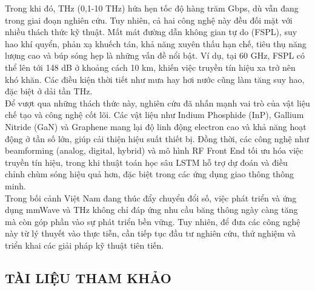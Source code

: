 \documentclass[a4paper,13pt]{article} %
\begin{document}
Trong khi đó, THz (0,1-10 THz) hứa hẹn tốc độ hàng trăm Gbps, dù vẫn đang trong giai đoạn nghiên cứu.
Tuy nhiên, cả hai công nghệ này đều đối mặt với nhiều thách thức kỹ thuật. Mất mát đường dẫn không gian tự do (FSPL), suy hao khí quyển, phản xạ khuếch tán, khả năng xuyên thấu hạn chế, tiêu thụ năng lượng cao và búp sóng hẹp là những vấn đề nổi bật. Ví dụ, tại 60 GHz, FSPL có thể lên tới 148 dB ở khoảng cách 10 km, khiến việc truyền tín hiệu xa trở nên khó khăn. Các điều kiện thời tiết như mưa hay hơi nước cũng làm tăng suy hao, đặc biệt ở dải tần THz.\\

Để vượt qua những thách thức này, nghiên cứu đã nhấn mạnh vai trò của vật liệu chế tạo và công nghệ cốt lõi. Các vật liệu như Indium Phosphide (InP), Gallium Nitride (GaN) và Graphene mang lại độ linh động electron cao và khả năng hoạt động ở tần số lớn, giúp cải thiện hiệu suất thiết bị. Đồng thời, các công nghệ như beamforming (analog, digital, hybrid) và mô hình RF Front End tối ưu hóa việc truyền tín hiệu, trong khi thuật toán học sâu LSTM hỗ trợ dự đoán và điều chỉnh chùm sóng hiệu quả hơn, đặc biệt trong các ứng dụng giao thông thông minh.\\

Trong bối cảnh Việt Nam đang thúc đẩy chuyển đổi số, việc phát triển và ứng dụng mmWave và THz không chỉ đáp ứng nhu cầu băng thông ngày càng tăng mà còn góp phần vào sự phát triển bền vững. Tuy nhiên, để đưa các công nghệ này từ lý thuyết vào thực tiễn, cần tiếp tục đầu tư nghiên cứu, thử nghiệm và triển khai các giải pháp kỹ thuật tiên tiến.



\clearpage
\begin{center}
    \section{TÀI LIỆU THAM KHẢO}
\end{center}

\printbibliography
\end{document}
